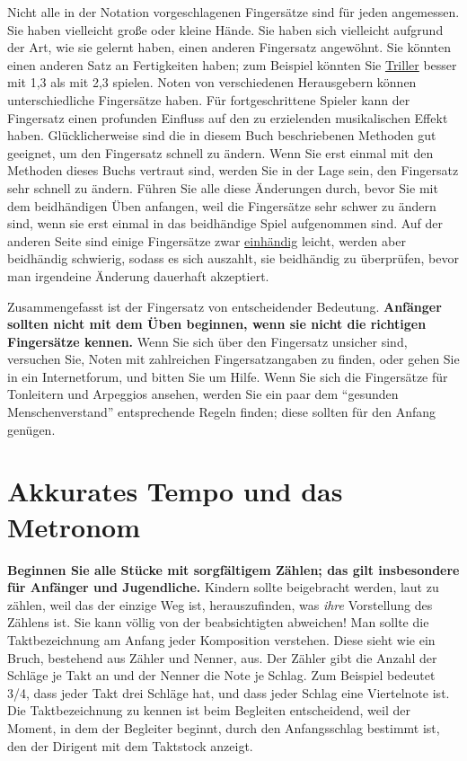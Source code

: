 Nicht alle in der Notation vorgeschlagenen Fingersätze sind für jeden angemessen.
Sie haben vielleicht große oder kleine Hände.
Sie haben sich vielleicht aufgrund der Art, wie sie gelernt haben, einen anderen Fingersatz angewöhnt.
Sie könnten einen anderen Satz an Fertigkeiten haben; zum Beispiel könnten Sie \hyperref[c1iii3]{Triller} besser mit 1,3 als mit 2,3 spielen.
Noten von verschiedenen Herausgebern können unterschiedliche Fingersätze haben.
Für fortgeschrittene Spieler kann der Fingersatz einen profunden Einfluss auf den zu erzielenden musikalischen Effekt haben.	
Glücklicherweise sind die in diesem Buch beschriebenen Methoden gut geeignet, um den Fingersatz schnell zu ändern.
Wenn Sie erst einmal mit den Methoden dieses Buchs vertraut sind, werden Sie in der Lage sein, den Fingersatz sehr schnell zu ändern.
Führen Sie alle diese Änderungen durch, bevor Sie mit dem beidhändigen Üben anfangen, weil die Fingersätze sehr schwer zu ändern sind, wenn sie erst einmal in das beidhändige Spiel aufgenommen sind.
Auf der anderen Seite sind einige Fingersätze zwar \hyperref[c1ii7]{einhändig} leicht, werden aber beidhändig schwierig, sodass es sich auszahlt, sie beidhändig zu überprüfen, bevor man irgendeine Änderung dauerhaft akzeptiert.

Zusammengefasst ist der Fingersatz von entscheidender Bedeutung. 
\textbf{Anfänger sollten nicht mit dem Üben beginnen, wenn sie nicht die richtigen Fingersätze kennen.}
Wenn Sie sich über den Fingersatz unsicher sind, versuchen Sie, Noten mit zahlreichen Fingersatzangaben zu finden, oder gehen Sie in ein Internetforum, und bitten Sie um Hilfe.
Wenn Sie sich die Fingersätze für Tonleitern und Arpeggios ansehen, werden Sie ein paar dem \enquote{gesunden Menschenverstand} entsprechende Regeln finden; diese sollten für den Anfang genügen.


\section{Akkurates Tempo und das Metronom}
\label{c1ii19}

\textbf{Beginnen Sie alle Stücke mit sorgfältigem Zählen; das gilt insbesondere für Anfänger und Jugendliche.}
Kindern sollte beigebracht werden, laut zu zählen, weil das der einzige Weg ist, herauszufinden, was \textit{ihre}  Vorstellung des Zählens ist.
Sie kann völlig von der beabsichtigten abweichen!
Man sollte die Taktbezeichnung am Anfang jeder Komposition verstehen.
Diese sieht wie ein Bruch, bestehend aus Zähler und Nenner, aus.
Der Zähler gibt die Anzahl der Schläge je Takt an und der Nenner die Note je Schlag.
Zum Beispiel bedeutet 3/4, dass jeder Takt drei Schläge hat, und dass jeder Schlag eine Viertelnote ist.
Die Taktbezeichnung zu kennen ist beim Begleiten entscheidend, weil der Moment, in dem der Begleiter beginnt, durch den Anfangsschlag bestimmt ist, den der Dirigent mit dem Taktstock anzeigt.

